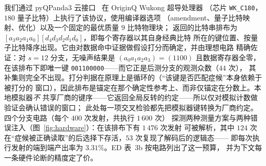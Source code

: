 \documentclass[11pt,a4paper]{article}
\begin{document}
我们通过 pyQPanda3 云接口~\cite{pyqpanda3,originq_cloud} 在 OriginQ Wukong 超导处理器
（芯片 \texttt{WK\_C180}，$180$ 量子比特）上执行了该协议，使用编译器选项
（amendment、量子比特映射、优化）以及一个固定的最优质量 $9$ 比特物理块；
返回的比特串排布为 $[a_3a_2a_1a_0][d_4d_3d_2d_1d_0]$，即每个寄存器以其自身经典比特
所在的键位置、按量子比特降序出现。它由对数据命中证据做假设打分而确定，并由理想电路
精确佐证：对 $s{=}12$ 分支，无噪声结果是 $(a_0a_1a_2a_3)=(1100)$ 且数据寄存器全零，
在该排布下即唯一键 \texttt{001100000}——而它正是后测分支的观测众数（$44$ 次），
其补集则完全不出现。打分判据在原理上是循环的（“该键是否匹配症候”本身依赖于被打分的
窗口），因此排布是锚定在那个确定性参考上、而非仅锚定在分数上。本地模拟器\emph{不}
共享厂商的键序——它返回全局反转的约定——所以仅对模拟计数做验证会确认错误的窗口；
此处每一项交叉检验都先把模拟器键转换为厂商约定。四个分支电路（每个 $400$ 次发射，共执行 $1\,600$ 次）
探测两种测量方案与两种错误注入（图~\ref{fig:hardware}）：在该排布下有 $1\,476$ 次发射
可被解析，其中 $124$ 次在“症候被正确读取”的后选择下存活，$53$ 次复现了解码后的逻辑态——
即每次执行发射的端到端产出率为 $3.31\%$。ED 表~3b 按电路列出了这一预算，
并为下文每一条硬件论断的精度定了价。
\end{document}
